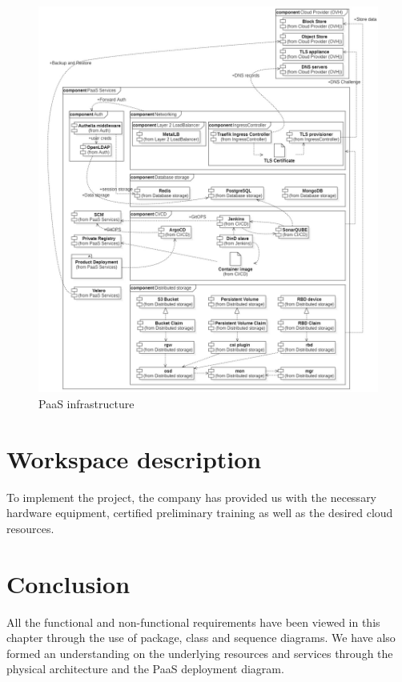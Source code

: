 \begin{figure}[H]\centering
\includegraphics[width=1.0\textwidth,angle=00]{assets/f8.jpg}
\caption{PaaS infrastructure}
\label{fig:f8}
\end{figure}

\section{Workspace description}

To implement the project, the company has provided us with the necessary hardware equipment, certified preliminary training as well as the desired cloud resources.

\section*{Conclusion}
All the functional and non-functional requirements have been viewed in this chapter through the use of package, class and sequence diagrams. We have also formed an understanding on the underlying resources and services through the physical architecture and the PaaS deployment diagram.



